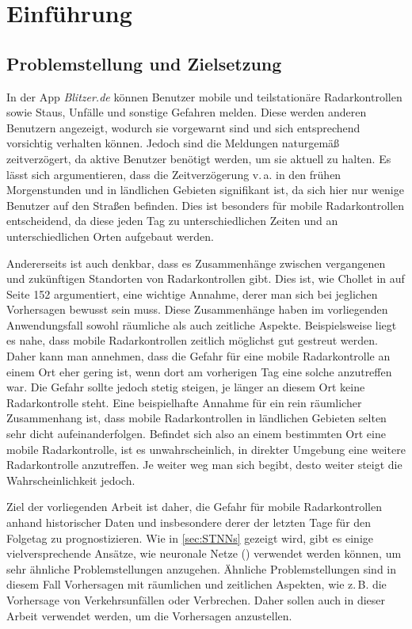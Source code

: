 \section{Einführung}
\label{sec:Einführung}

\subsection{Problemstellung und Zielsetzung}
\label{sec:Problemstellung}
In der App \emph{Blitzer.de} können Benutzer mobile und teilstationäre Radarkontrollen sowie Staus, Unfälle und sonstige Gefahren melden.
Diese werden anderen Benutzern angezeigt, wodurch sie vorgewarnt sind und sich entsprechend vorsichtig verhalten können.
Jedoch sind die Meldungen naturgemäß zeitverzögert, da aktive Benutzer benötigt werden, um sie aktuell zu halten.
Es lässt sich argumentieren, dass die Zeitverzögerung v.\,a. in den frühen Morgenstunden und in ländlichen Gebieten signifikant ist,
da sich hier nur wenige Benutzer auf den Straßen befinden.
Dies ist besonders für mobile Radarkontrollen entscheidend, da diese jeden Tag zu unterschiedlichen Zeiten und an unterschiedlichen Orten aufgebaut werden.

Andererseits ist auch denkbar, dass es Zusammenhänge zwischen vergangenen und zukünftigen Standorten von Radarkontrollen gibt.
Dies ist, wie Chollet in \cite{DeepLearningPythonKeras} auf Seite 152 argumentiert, eine wichtige Annahme, derer man sich bei jeglichen Vorhersagen bewusst sein muss.
Diese Zusammenhänge haben im vorliegenden Anwendungsfall sowohl räumliche als auch zeitliche Aspekte.
Beispielsweise liegt es nahe, dass mobile Radarkontrollen zeitlich möglichst gut gestreut werden.
Daher kann man annehmen, dass die Gefahr für eine mobile Radarkontrolle an einem Ort eher gering ist, wenn dort am vorherigen Tag eine solche anzutreffen war.
Die Gefahr sollte jedoch stetig steigen, je länger an diesem Ort keine Radarkontrolle steht.
Eine beispielhafte Annahme für ein rein räumlicher Zusammenhang ist, dass mobile Radarkontrollen in ländlichen Gebieten selten sehr dicht aufeinanderfolgen.
Befindet sich also an einem bestimmten Ort eine mobile Radarkontrolle, ist es unwahrscheinlich, in direkter Umgebung eine weitere Radarkontrolle anzutreffen.
Je weiter weg man sich begibt, desto weiter steigt die Wahrscheinlichkeit jedoch.

Ziel der vorliegenden Arbeit ist daher, die Gefahr für mobile Radarkontrollen anhand historischer Daten und insbesondere derer der letzten Tage für den Folgetag zu prognostizieren.
Wie in \autoref{sec:STNNs} gezeigt wird, gibt es einige vielversprechende Ansätze, wie neuronale Netze () verwendet werden können, um sehr ähnliche Problemstellungen anzugehen.
Ähnliche Problemstellungen sind in diesem Fall Vorhersagen mit räumlichen und zeitlichen Aspekten, wie z.\,B. die Vorhersage von Verkehrsunfällen oder Verbrechen.
Daher sollen auch in dieser Arbeit  verwendet werden, um die Vorhersagen anzustellen.

